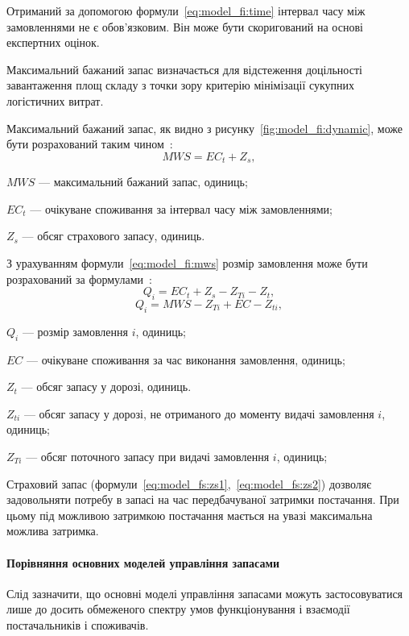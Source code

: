 Отриманий за допомогою формули~\eqref{eq:model_fi:time} інтервал часу між замовленнями не є обов'язковим.
Він може бути скоригований на основі експертних оцінок.

Максимальний бажаний запас визначається для відстеження доцільності завантаження площ складу з точки зору критерію мінімізації сукупних логістичних витрат.

Максимальний бажаний запас, як видно з рисунку~\ref{fig:model_fi:dynamic}, може бути розрахований таким чином~\cite{Sterligova2008}:
\begin{equation} \label{eq:model_fi:mws}
MWS=EC_t+Z_s
,
\end{equation}
\begin{description}
	\item[де] $MWS$ --- максимальний бажаний запас, одиниць;
	\item $EC_t$ --- очікуване споживання за інтервал часу між замовленнями;
	\item $Z_s$ --- обсяг страхового запасу, одиниць.
\end{description}

З урахуванням формули~\eqref{eq:model_fi:mws} розмір замовлення може бути розрахований за формулами~\cite{Sterligova2008}:
\begin{equation} \label{eq:order}
Q_i=EC_t+Z_s-Z_{Ti}-Z_t
,
\end{equation}
\begin{equation} \label{eq:order2}
Q_i=MWS-Z_{Ti}+EC-Z_{ti}
,
\end{equation}
\begin{description}
	\item[де] $Q_i$ --- розмір замовлення $i$, одиниць;
	\item $EC$ --- очікуване споживання за час виконання замовлення, одиниць;
	\item $Z_t$ --- обсяг запасу у дорозі, одиниць.
	\item $Z_{ti}$ --- обсяг запасу у дорозі, не отриманого до моменту видачі замовлення $i$, одиниць;
	\item $Z_{Ti}$ --- обсяг поточного запасу при видачі замовлення $i$, одиниць;
\end{description}

Страховий запас (формули~\ref{eq:model_fs:zs1},~\ref{eq:model_fs:zs2}) дозволяє задовольняти потребу в запасі на час передбачуваної затримки постачання.
При цьому під можливою затримкою постачання мається на увазі максимальна можлива затримка.

\paragraph{Порівняння основних моделей управління запасами}
Слід зазначити, що основні моделі управління запасами можуть застосовуватися лише до досить обмеженого спектру умов функціонування і взаємодії постачальників і споживачів.

